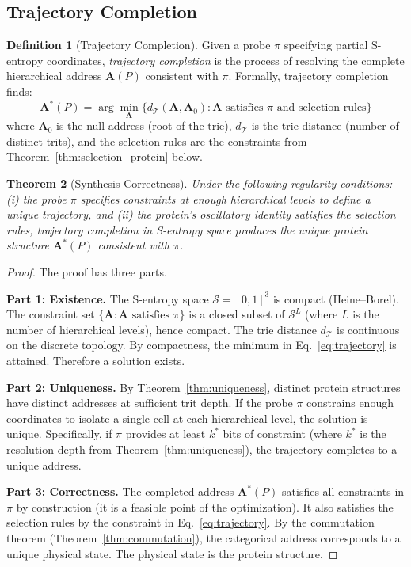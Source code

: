\documentclass[11pt,twocolumn,a4paper]{article}
\newtheorem{theorem}{Theorem}[section]
\theoremstyle{definition}
\newtheorem{definition}[theorem]{Definition}
\theoremstyle{remark}
\newcommand{\Sspace}{\mathcal{S}}
\newcommand{\Trie}{\mathcal{T}}
\begin{document}
\subsection{Trajectory Completion}

\begin{definition}[Trajectory Completion]
\label{def:trajectory_completion}
Given a probe $\pi$ specifying partial S-entropy coordinates, \emph{trajectory completion} is the process of resolving the complete hierarchical address $\mathbf{A}(P)$ consistent with $\pi$. Formally, trajectory completion finds:
\begin{equation}
\mathbf{A}^*(P) = \arg\min_{\mathbf{A}} \bigl\{ d_{\Trie}(\mathbf{A}, \mathbf{A}_0) : \mathbf{A} \text{ satisfies } \pi \text{ and selection rules}\bigr\}
\label{eq:trajectory}
\end{equation}
where $\mathbf{A}_0$ is the null address (root of the trie), $d_{\Trie}$ is the trie distance (number of distinct trits), and the selection rules are the constraints from Theorem~\ref{thm:selection_protein} below.
\end{definition}

\begin{theorem}[Synthesis Correctness]
\label{thm:synthesis_correct}
Under the following regularity conditions: (i) the probe $\pi$ specifies constraints at enough hierarchical levels to define a unique trajectory, and (ii) the protein's oscillatory identity satisfies the selection rules, trajectory completion in S-entropy space produces the unique protein structure $\mathbf{A}^*(P)$ consistent with $\pi$.
\end{theorem}

\begin{proof}
The proof has three parts.

\textbf{Part 1: Existence.} The S-entropy space $\Sspace = [0,1]^3$ is compact (Heine--Borel). The constraint set $\{\mathbf{A} : \mathbf{A} \text{ satisfies } \pi\}$ is a closed subset of $\Sspace^L$ (where $L$ is the number of hierarchical levels), hence compact. The trie distance $d_{\Trie}$ is continuous on the discrete topology. By compactness, the minimum in Eq.~\eqref{eq:trajectory} is attained. Therefore a solution exists.

\textbf{Part 2: Uniqueness.} By Theorem~\ref{thm:uniqueness}, distinct protein structures have distinct addresses at sufficient trit depth. If the probe $\pi$ constrains enough coordinates to isolate a single cell at each hierarchical level, the solution is unique. Specifically, if $\pi$ provides at least $k^*$ bits of constraint (where $k^*$ is the resolution depth from Theorem~\ref{thm:uniqueness}), the trajectory completes to a unique address.

\textbf{Part 3: Correctness.} The completed address $\mathbf{A}^*(P)$ satisfies all constraints in $\pi$ by construction (it is a feasible point of the optimization). It also satisfies the selection rules by the constraint in Eq.~\eqref{eq:trajectory}. By the commutation theorem (Theorem~\ref{thm:commutation}), the categorical address corresponds to a unique physical state. The physical state is the protein structure.
\end{proof}
\end{document}
